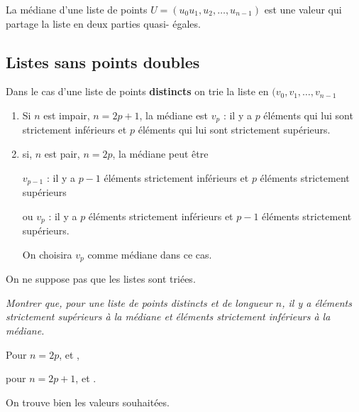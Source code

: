 \begin{defin}
La médiane d'une liste de points $U=(u_0u_1, u_2,\ldots,u_{n-1})$ est une valeur qui partage la liste en deux parties quasi- égales. 
\end{defin}
\subsection{Listes sans points doubles} 
Dans le cas d'une liste de points {\bf distincts} on trie la liste en $(v_0, v_1,\ldots,v_{n-1}$ 

\begin{enumerate}
\item Si $n$ est impair, $n=2p+1$, la médiane est $v_p$ : il y a $p$ éléments qui lui sont strictement inférieurs et $p$ éléments qui lui sont strictement supérieurs.
\item si, $n$ est pair, $n=2p$, la médiane peut être 

$v_{p-1}$ : il y a $p-1$ éléments strictement inférieurs et $p$ éléments strictement supérieurs

ou $v_p$ : il y a $p$ éléments strictement inférieurs et $p-1$ éléments strictement  supérieurs.

On choisira $v_p$ comme médiane dans ce cas.
\end{enumerate}
\medskip

On ne suppose pas que les listes sont triées.
\begin{Exercise}\it Montrer que, pour une liste de points distincts et de longueur $n$, il y a  éléments strictement supérieurs à la médiane et  éléments strictement inférieurs à la médiane.
\end{Exercise}
\begin{Answer} 
Pour $n=2p$,  et ,

pour $n=2p+1$,  et .

On trouve bien les valeurs souhaitées.
\end{Answer}
\medskip

